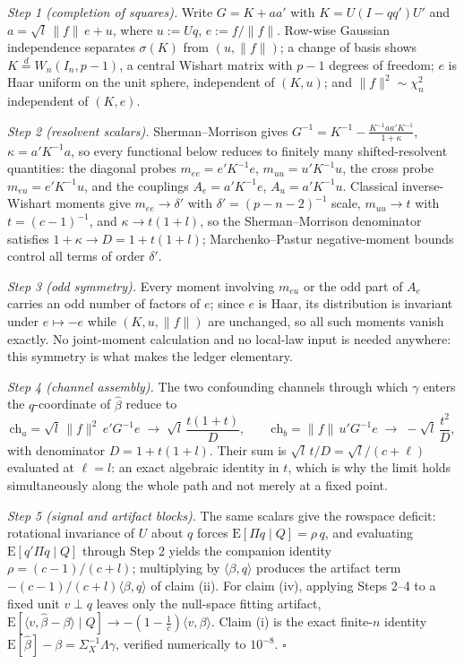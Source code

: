 \documentclass[11pt]{article}
\theoremstyle{definition}
\theoremstyle{remark}
\newcommand{\E}{\mathrm{E}}
\begin{document}
\medskip
\noindent\emph{Step 1 (completion of squares).} Write $G=K+aa'$ with
$K=U(I-qq')U'$ and $a=\sqrt{l}\,\|f\|\,e+u$, where $u:=Uq$, $e:=f/\|f\|$. Row-wise Gaussian independence separates $\sigma(K)$ from $(u,\|f\|)$; a change of basis shows $K\stackrel{d}{=}W_n(I_n,p-1)$, a central Wishart matrix with $p-1$ degrees of freedom; $e$ is Haar uniform on the unit sphere, independent of $(K,u)$; and $\|f\|^2\sim\chi_n^2$ independent of $(K,e)$.

\medskip
\noindent\emph{Step 2 (resolvent scalars).} Sherman--Morrison gives
$G^{-1}=K^{-1}-\frac{K^{-1}aa'K^{-1}}{1+\kappa}$, $\kappa=a'K^{-1}a$,
so every functional below reduces to finitely many shifted-resolvent quantities: the diagonal probes $m_{ee}=e'K^{-1}e$, $m_{uu}=u'K^{-1}u$, the cross probe $m_{eu}=e'K^{-1}u$, and the couplings $A_e=a'K^{-1}e$, $A_u=a'K^{-1}u$. Classical inverse-Wishart moments give $m_{ee}\to\delta'$ with $\delta'=(p-n-2)^{-1}$ scale, $m_{uu}\to t$ with $t=(c-1)^{-1}$, and $\kappa\to t(1+l)$, so the Sherman--Morrison denominator satisfies $1+\kappa\to D=1+t(1+l)$; Marchenko--Pastur negative-moment bounds control all terms of order $\delta'$.

\medskip
\noindent\emph{Step 3 (odd symmetry).} Every moment involving $m_{eu}$ or the odd part of $A_e$ carries an odd number of factors of $e$; since $e$ is Haar, its distribution is invariant under $e\mapsto-e$ while $(K,u,\|f\|)$ are unchanged, so all such moments vanish exactly. No joint-moment calculation and no local-law input is needed anywhere: this symmetry is what makes the ledger elementary.

\medskip
\noindent\emph{Step 4 (channel assembly).} The two confounding channels through which $\gamma$ enters the $q$-coordinate of $\hat\beta$ reduce to
\[
\mathrm{ch}_a=\sqrt{l}\,\|f\|^2\,e'G^{-1}e
\;\to\;\sqrt{l}\,\frac{t(1+t)}{D},
\qquad
\mathrm{ch}_b=\|f\|\,u'G^{-1}e
\;\to\;-\sqrt{l}\,\frac{t^{2}}{D},
\]
with denominator $D=1+t(1+l)$. Their sum is
$\sqrt{l}\,t/D=\sqrt{l}/(c+\ell)$ evaluated at $\ell=l$: an exact algebraic identity in $t$, which is why the limit holds simultaneously along the whole path and not merely at a fixed point.

\medskip
\noindent\emph{Step 5 (signal and artifact blocks).} The same scalars give the rowspace deficit: rotational invariance of $U$ about $q$ forces $\E[\Pi q\mid Q]=\rho\,q$, and evaluating $\E[q'\Pi q\mid Q]$ through Step 2 yields the companion identity $\rho=(c-1)/(c+l)$; multiplying by $\langle\beta,q\rangle$ produces the artifact term $-(c-1)/(c+l)\langle\beta,q\rangle$ of claim (ii). For claim (iv), applying Steps 2--4 to a fixed unit $v\perp q$ leaves only the null-space fitting artifact, $\E[\langle v,\hat\beta-\beta\rangle\mid Q]\to-(1-\frac1c)\langle v,\beta\rangle$. Claim (i) is the exact finite-$n$ identity $\E[\hat\beta]-\beta=\Sigma_X^{-1}\Lambda\gamma$, verified numerically to $10^{-8}$. \hfill$\square$
\end{document}

